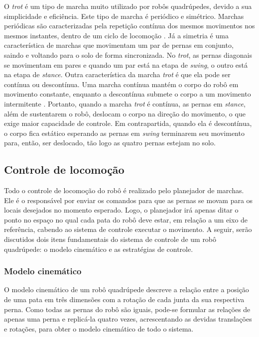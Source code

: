 \documentclass[../main.tex]{subfiles}
\begin{document}
O \textit{trot} é um tipo de marcha muito utilizado por robôs quadrúpedes, devido a sua simplicidade e eficiência. Este tipo de marcha é periódico e simétrico. Marchas periódicas são caracterizadas pela repetição contínua dos mesmos movimentos nos mesmos instantes, dentro de um ciclo de locomoção \cite{de2006quadrupedal}. Já a simetria é uma característica de marchas que movimentam um par de pernas em conjunto, saindo e voltando para o solo de forma sincronizada. No \textit{trot}, as pernas diagonais se movimentam em pares e quando um par está na etapa de \textit{swing}, o outro está na etapa de \textit{stance}. Outra característica da marcha \textit{trot} é que ela pode ser contínua ou descontínua. Uma marcha contínua mantém o corpo do robô em movimento constante, enquanto a descontínua submete o corpo a um movimento intermitente \cite{de2006quadrupedal}. Portanto, quando a marcha \textit{trot} é contínua, as pernas em \textit{stance}, além de sustentarem o robô, deslocam o corpo na direção do movimento, o que exige maior capacidade de controle. Em contrapartida, quando ela é descontínua, o corpo fica estático esperando as pernas em \textit{swing} terminarem seu movimento para, então, ser deslocado, tão logo as quatro pernas estejam no solo.

\subsection{Controle de locomoção}

Todo o controle de locomoção do robô é realizado pelo planejador de marchas. Ele é o responsável por enviar os comandos para que as pernas se movam para os locais desejados no momento esperado. Logo, o planejador irá apenas ditar o ponto no espaço no qual cada pata do robô deve estar, em relação a um eixo de referência, cabendo ao sistema de controle executar o movimento. A seguir, serão discutidos dois itens fundamentais do sistema de controle de um robô quadrúpede: o modelo cinemático e as estratégias de controle.

\subsubsection{Modelo cinemático}
O modelo cinemático de um robô quadrúpede descreve a relação entre a posição de uma pata em três dimensões com a rotação de cada junta da sua respectiva perna. Como todas as pernas do robô são iguais, pode-se formular as relações de apenas uma perna e replicá-la quatro vezes, acrescentando as devidas translações e rotações, para obter o modelo cinemático de todo o sistema.
\end{document}

